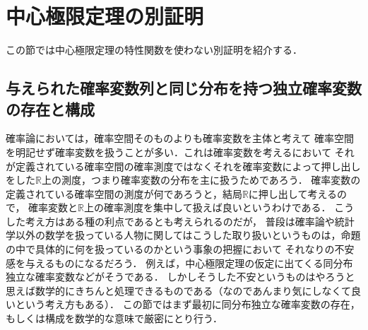\documentclass[leqno, 12pt]{jsarticle}
\newcommand{\rr}{\mathbb{R}}
\begin{document}
\section{中心極限定理の別証明}


この節では中心極限定理の特性関数を使わない別証明を紹介する．


\subsection{与えられた確率変数列と同じ分布を持つ独立確率変数の存在と構成}

確率論においては，確率空間そのものよりも確率変数を主体と考えて
確率空間を明記せず確率変数を扱うことが多い．これは確率変数を考えるにおいて
それが定義されている確率空間の確率測度ではなくそれを確率変数によって押し出しをした$\rr$上の測度，つまり確率変数の分布を主に扱うためであろう．
確率変数の定義されている確率空間の測度が何であろうと，結局$\rr$に押し出して考えるので，
確率変数と$\rr$上の確率測度を集中して扱えば良いというわけである．
こうした考え方はある種の利点であるとも考えられるのだが，
普段は確率論や統計学以外の数学を扱っている人物に関してはこうした取り扱いというものは，命題の中で具体的に何を扱っているのかという事象の把握において
それなりの不安感を与えるものになるだろう．
例えば，中心極限定理の仮定に出てくる同分布独立な確率変数などがそうである．
しかしそうした不安というものはやろうと思えば数学的にきちんと処理できるものである（なのであんまり気にしなくて良いという考え方もある）．
この節ではまず最初に同分布独立な確率変数の存在，もしくは構成を数学的な意味で厳密にとり行う．
\end{document}
